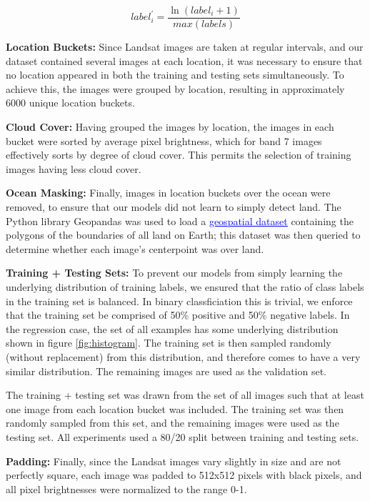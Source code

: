 \documentclass[10pt]{article}
\begin{document}
\begin{equation}
label^{\prime}_i = \frac{\ln(label_i + 1)}{max(labels)}
\end{equation}

\textbf{Location Buckets:}
Since Landsat images are taken at regular intervals,
and our dataset contained several images at each location, it was necessary to
ensure that no location appeared in both the training and testing sets simultaneously.
To achieve this, the images were grouped by location, resulting in approximately
6000 unique location buckets.

\textbf{Cloud Cover:}
Having grouped the images by location, the images in each bucket were sorted
by average pixel brightness, which for band 7 images effectively sorts by degree
of cloud cover. This permits the selection of training images having less cloud cover.

\textbf{Ocean Masking:}
Finally, images in location buckets over the ocean were removed, to ensure that our models
did not learn to simply detect land. The Python library Geopandas was used to load
a \href{https://www.naturalearthdata.com/}{\textcolor{blue}{\underline{geospatial dataset}}}
containing the polygons of the boundaries of all land on Earth; this dataset was
then queried to determine whether each image's centerpoint was over land.

\textbf{Training + Testing Sets:}
To prevent our models from simply learning the underlying distribution
of training labels, we ensured that the ratio of class labels in the training
set is balanced. In binary classficiation this is trivial, we enforce that
the training set be comprised of 50\% positive and 50\% negative labels. In
the regression case, the set of all examples has some underlying distribution
shown in figure \ref{fig:histogram}. The training set is then sampled randomly
(without replacement) from this distribution, and therefore comes to have a very
similar distribution. The remaining images are used as the validation set.

The training + testing set was drawn from the set of all images such that at least
one image from each location bucket was included. The training set was then
randomly sampled from this set, and the remaining images were used as the testing set.
All experiments used a 80/20 split between training and testing sets.

\textbf{Padding:}
Finally, since the Landsat images vary slightly in size and are not perfectly square,
each image was padded to 512x512 pixels with black pixels, and all pixel brightnesses
were normalized to the range 0-1. 
\end{document}
